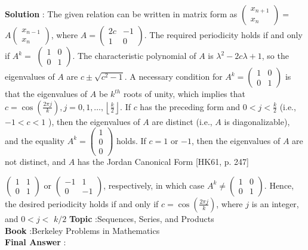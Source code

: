 \documentclass[10pt]{article}
\begin{document}
\textbf{Solution} : The given relation can be written in matrix form as $\left(\begin{array}{c}x_{n+1} \\ x_{n}\end{array}\right)=$ $A\left(\begin{array}{c}x_{n-1} \\ x_{n}\end{array}\right)$, where $A=\left(\begin{array}{cc}2 c & -1 \\ 1 & 0\end{array}\right)$. The required periodicity holds if and only if $A^{k}=$ $\left(\begin{array}{ll}1 & 0 \\ 0 & 1\end{array}\right)$. The characteristic polynomial of $A$ is $\lambda^{2}-2 c \lambda+1$, so the eigenvalues of $A$ are $c \pm \sqrt{c^{2}-1}$. A necessary condition for $A^{k}=\left(\begin{array}{ll}1 & 0 \\ 0 & 1\end{array}\right)$ is that the eigenvalues of $A$ be $k^{t h}$ roots of unity, which implies that $c=\cos \left(\frac{2 \pi j}{k}\right), j=0,1, \ldots,\left\lfloor\frac{k}{2}\right\rfloor$. If $c$ has the preceding form and $0<j<\frac{k}{2}$ (i.e., $-1<c<1$ ), then the eigenvalues of $A$ are distinct (i.e., $A$ is diagonalizable), and the equality $A^{k}=\left(\begin{array}{l}1 \\ 0 \\ 0\end{array}\right)$ holds. If $c=1$ or $-1$, then the eigenvalues of $A$ are not distinct, and $A$ has the Jordan Canonical Form [HK61, p. 247]

$\left(\begin{array}{ll}1 & 1 \\ 0 & 1\end{array}\right)$ or $\left(\begin{array}{cc}-1 & 1 \\ 0 & -1\end{array}\right)$, respectively, in which case $A^{k} \neq\left(\begin{array}{ll}1 & 0 \\ 0 & 1\end{array}\right)$. Hence, the desired periodicity holds if and only if $c=\cos \left(\frac{2 \pi j}{k}\right)$, where $j$ is an integer, and $0<j<$ $k / 2$
\textbf{Topic} :Sequences, Series, and Products \\
\textbf{Book} :Berkeley Problems in Mathematics\\
\textbf{Final Answer} :\\
\end{document}
